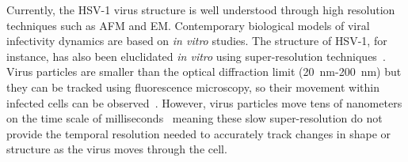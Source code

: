 Currently, the \gls{HSV}-1 virus structure is well understood through high resolution techniques such as \gls{AFM} and \gls{EM}.
Contemporary biological models of viral infectivity dynamics are based on \textit{in vitro} studies. %
The structure of \gls{HSV}-1, for instance, has also been eluclidated \textit{in vitro} using super-resolution techniques~\cite{laine_structural_2015}.
Virus particles are smaller than the optical diffraction limit (\SI{20}{\nano\meter}-\SI{200}{\nano\meter})
but they can be tracked using fluorescence microscopy, so their movement within infected cells can be observed~\cite{pereira_hiv_2012}.
However, virus particles move tens of nanometers on the time scale of milliseconds~\cite{brandenburg_virus_2007} meaning these slow super-resolution do not provide the temporal resolution needed to accurately track changes in shape or structure as the virus moves through the cell.

%

